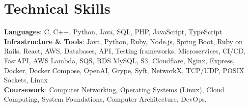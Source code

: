 \documentclass[letterpaper,10pt]{article}
\begin{document}
\section{Technical Skills}
 \begin{itemize}[leftmargin=0.15in, label={}]
    \small{\item{
     \textbf{Languages}{: C, C++, Python, Java, SQL, PHP, JavaScript, TypeScript} \\
     \textbf{Infrastructure \& Tools}{: Java, Python, Ruby, Node.js, Spring Boot, Ruby on Rails, React, AWS, Databases, API, Testing frameworks, Microservices, CI/CD, FastAPI, AWS Lambda, SQS, RDS MySQL, S3, Cloudflare, Nginx, Express, Docker, Docker Compose, OpenAI, Grype, Syft, NetworkX, TCP/UDP, POSIX Sockets, Linux} \\
     \textbf{Coursework}{: Computer Networking, Operating Systems (Linux), Cloud Computing, System Foundations, Computer Architecture, DevOps.}
    }}
 \end{itemize}


\end{document}
